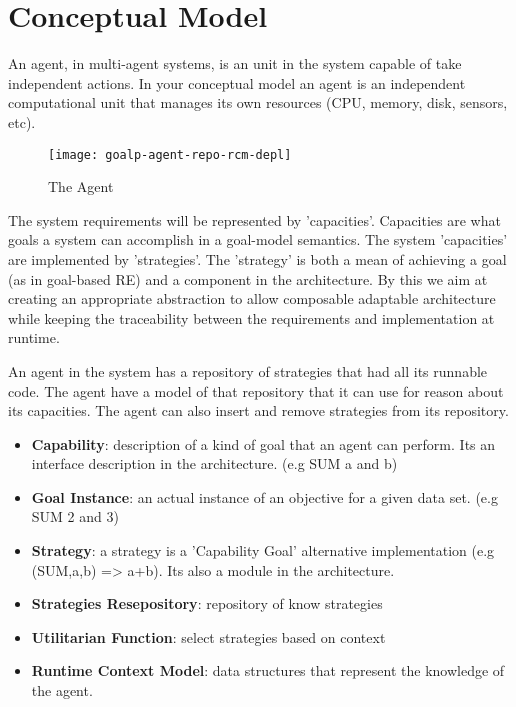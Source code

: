 \section{Conceptual Model}
\label{conceptual_model}

An agent, in multi-agent systems, is an unit in the system capable of take independent actions. In your conceptual model an agent is an independent computational unit that manages its own resources (CPU, memory, disk, sensors, etc).

\begin{figure}
  \centering
  \texttt{[image: goalp-agent-repo-rcm-depl]}
  \caption{The Agent}
  \label{fig:goalp-agent}
\end{figure}



The system requirements will be represented by 'capacities'. Capacities are what goals a system can accomplish in a goal-model semantics. The system 'capacities' are implemented by 'strategies'.
The 'strategy' is both a mean of achieving a goal (as in goal-based RE) and a component in the architecture. By this we aim at creating an appropriate abstraction to allow composable adaptable architecture while keeping the traceability between the requirements and implementation at runtime.

An agent in the system has a repository of strategies that had all its runnable code. The agent have a model of that repository that it can use for reason about its capacities. The agent can also insert and remove strategies from its repository.

\begin{itemize}
  \item \textbf{Capability}: description of a kind of goal that an agent can perform.   Its an interface description in the architecture. (e.g SUM a and b)
  \item \textbf{Goal Instance}: an actual instance of an objective for a given data set. (e.g SUM 2 and 3)
  \item \textbf{Strategy}: a strategy is a 'Capability Goal' alternative implementation (e.g (SUM,a,b) => {a+b}). Its also a module in the architecture.
  \item \textbf{Strategies Resepository}: repository of know strategies
  \item \textbf{Utilitarian Function}: select strategies based on context
  \item \textbf{Runtime Context Model}: data structures that represent the knowledge of the agent.
\end{itemize}

